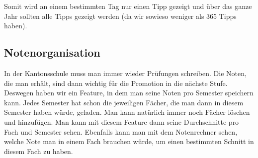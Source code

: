 \documentclass[12pt,a4paper]{report}
\begin{document}
Somit wird an einem bestimmten Tag nur einen Tipp gezeigt und über das ganze Jahr sollten alle Tipps gezeigt werden (da wir sowieso weniger als 365 Tipps haben).



\subsection{Notenorganisation}
In der Kantonsschule muss man immer wieder Prüfungen schreiben. Die Noten, die man erhält, sind dann wichtig für die Promotion in die nächste Stufe. Deswegen haben wir ein Feature, in dem man seine Noten pro Semester speichern kann. Jedes Semester hat schon die jeweiligen Fächer, die man dann in diesem Semester haben würde, geladen. Man kann natürlich immer noch Fächer löschen und hinzufügen. Man kann mit diesem Feature dann seine Durchschnitte pro Fach und Semester sehen. Ebenfalls kann man mit dem Notenrechner sehen, welche Note man in einem Fach brauchen würde, um einen bestimmten Schnitt in diesem Fach zu haben.




\clearpage
\clearpage
{} %
\nocite{*}
\printbibliography[title={Literaturverzeichnis}]
\end{document}
